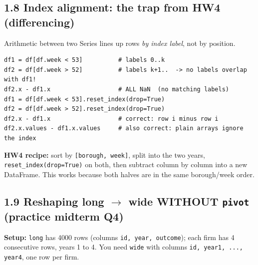\documentclass[10pt]{article}
\newcommand{\code}[1]{\lstinline[basicstyle=\ttfamily\small]{#1}}
\begin{document}
\subsection*{1.8 Index alignment: the trap from HW4 (differencing)}
Arithmetic between two Series lines up rows \emph{by index label}, not by position.
\begin{lstlisting}
df1 = df[df.week < 53]          # labels 0..k
df2 = df[df.week > 52]          # labels k+1..  -> no labels overlap with df1!
df2.x - df1.x                   # ALL NaN  (no matching labels)
df1 = df[df.week < 53].reset_index(drop=True)
df2 = df[df.week > 52].reset_index(drop=True)
df2.x - df1.x                   # correct: row i minus row i
df2.x.values - df1.x.values     # also correct: plain arrays ignore the index
\end{lstlisting}
\textbf{HW4 recipe:} sort by \code{[borough, week]}, split into the two years, \code{reset_index(drop=True)} on both, then subtract column by column into a new DataFrame. This works because both halves are in the same borough/week order.

\subsection*{1.9 Reshaping long $\to$ wide WITHOUT \texttt{pivot} (practice midterm Q4)}
\textbf{Setup:} \code{long} has 4000 rows (columns \code{id, year, outcome}); each firm has 4 consecutive rows, years 1 to 4. You need \code{wide} with columns \code{id, year1, ..., year4}, one row per firm.
\end{document}
